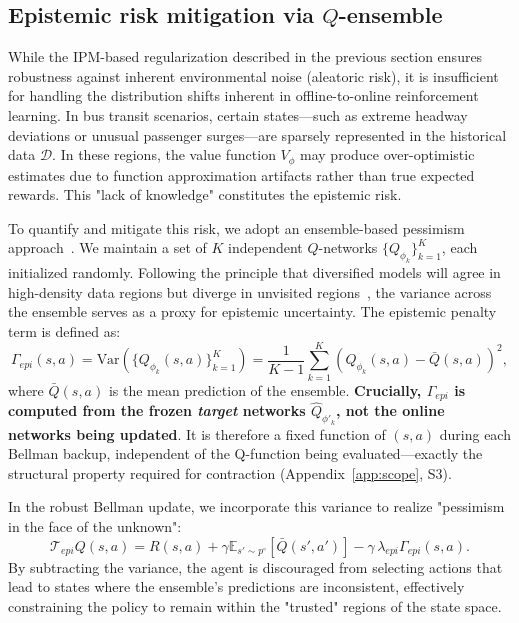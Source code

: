 \documentclass[10pt]{article}
\begin{document}
\subsection{Epistemic risk mitigation via $Q$-ensemble}
While the IPM-based regularization described in the previous section ensures robustness against inherent environmental noise (aleatoric risk), it is insufficient for handling the distribution shifts inherent in offline-to-online reinforcement learning. In bus transit scenarios, certain states---such as extreme headway deviations or unusual passenger surges---are sparsely represented in the historical data $\mathcal{D}$. In these regions, the value function $V_\phi$ may produce over-optimistic estimates due to function approximation artifacts rather than true expected rewards. This "lack of knowledge" constitutes the epistemic risk.

To quantify and mitigate this risk, we adopt an ensemble-based pessimism approach~\cite{Osband2016BootstrappedDQN, An2021UncertaintyEnsemble}. We maintain a set of $K$ independent $Q$-networks $\{Q_{\phi_k}\}_{k=1}^K$, each initialized randomly. Following the principle that diversified models will agree in high-density data regions but diverge in unvisited regions~\cite{An2021UncertaintyEnsemble}, the variance across the ensemble serves as a proxy for epistemic uncertainty. The epistemic penalty term is defined as:
\begin{equation}
    \label{eq:gamma_epi}
    \Gamma_{epi}(s, a) = \text{Var}(\{Q_{\phi_k}(s, a)\}_{k=1}^K) = \frac{1}{K-1} \sum_{k=1}^K (Q_{\phi_k}(s, a) - \bar{Q}(s, a))^2,
\end{equation}
where $\bar{Q}(s, a)$ is the mean prediction of the ensemble.
\textbf{Crucially, $\Gamma_{epi}$ is computed from the frozen \emph{target} networks $\hat{Q}_{\phi'_k}$, not the online networks being updated}.  It is therefore a fixed function of $(s,a)$ during each Bellman backup, independent of the Q-function being evaluated---exactly the structural property required for contraction (Appendix~\ref{app:scope}, S3).

In the robust Bellman update, we incorporate this variance to realize "pessimism in the face of the unknown":
\begin{equation}
    \mathcal{T}_{epi} Q(s, a) = R(s, a) + \gamma \mathbb{E}_{s' \sim p^\circ} [ \bar{Q}(s', a') ] - \gamma\,\lambda_{epi} \Gamma_{epi}(s, a).
\end{equation}
By subtracting the variance, the agent is discouraged from selecting actions that lead to states where the ensemble's predictions are inconsistent, effectively constraining the policy to remain within the "trusted" regions of the state space.
\end{document}
